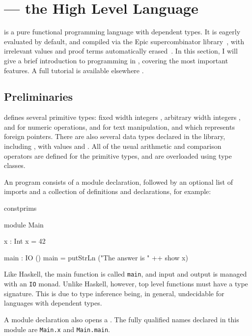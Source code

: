 \section{\Idris{} --- the High Level Language}

\label{sect:hll}

\Idris{} is
a pure functional programming language with dependent types. It is
eagerly evaluated by default, and compiled via the Epic supercombinator
library~\cite{brady2011epic}, with irrelevant values and proof terms
automatically erased~\cite{Brady2003,Brady2005}.
In this section, I will give a brief introduction to programming in \Idris{},
covering the most important features. A full tutorial is available elsewhere
\cite{idristutorial}. 

\subsection{Preliminaries}

\Idris{} defines several primitive types: fixed width integers
, arbitrary width integers , and
 for numeric operations,  and  for
text manipulation, and  which represents foreign pointers.
There are also several data types declared in the library, including
, with values  and . All of the usual
arithmetic and comparison operators are defined for the primitive types,
and are overloaded using type classes.

An \Idris{} program consists of a module declaration, followed by an optional
list of imports and a collection of definitions and declarations, for example:

\begin{SaveVerbatim}{constprims}

module Main

x : Int
x = 42

main : IO ()
main = putStrLn ("The answer is " ++ show x)

\end{SaveVerbatim}

\noindent
Like Haskell, the main function is called \texttt{main}, and input and output
is managed with an \texttt{IO} monad. Unlike Haskell, however,  top
level functions must have a type signature. This is due to type inference
being, in general, undecidable for languages with dependent types.

A module declaration also opens a . The fully qualified names
declared in this module are \texttt{Main.x} and \texttt{Main.main}.



